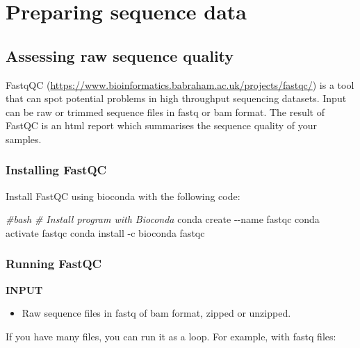 \documentclass[
  12pt,
]{article}
\newenvironment{Shaded}{\begin{snugshade}}{\end{snugshade}}
\newcommand{\AttributeTok}[1]{\textcolor[rgb]{0.13,0.29,0.53}{#1}}
\newcommand{\CommentTok}[1]{\textcolor[rgb]{0.56,0.35,0.01}{\textit{#1}}}
\newcommand{\ExtensionTok}[1]{#1}
\newcommand{\NormalTok}[1]{#1}
\providecommand{\tightlist}{%
  \setlength{\itemsep}{0pt}\setlength{\parskip}{0pt}}
\begin{document}
\hypertarget{preparing-sequence-data}{%
\section{Preparing sequence data}\label{preparing-sequence-data}}

\hypertarget{assessing-raw-sequence-quality}{%
\subsection{Assessing raw sequence quality}\label{assessing-raw-sequence-quality}}

FastqQC (\url{https://www.bioinformatics.babraham.ac.uk/projects/fastqc/}) is a tool that can spot potential problems in high throughput sequencing datasets. Input can be raw or trimmed sequence files in fastq or bam format. The result of FastQC is an html report which summarises the sequence quality of your samples.

\hypertarget{installing-fastqc}{%
\subsubsection{Installing FastQC}\label{installing-fastqc}}

Install FastQC using bioconda with the following code:

\begin{Shaded}
\begin{Highlighting}[]
\CommentTok{\#bash}
\CommentTok{\# Install program with Bioconda}
\ExtensionTok{conda}\NormalTok{ create }\AttributeTok{{-}{-}name}\NormalTok{ fastqc}
\ExtensionTok{conda}\NormalTok{ activate fastqc}
\ExtensionTok{conda}\NormalTok{ install }\AttributeTok{{-}c}\NormalTok{ bioconda fastqc}
\end{Highlighting}
\end{Shaded}

\hypertarget{running-fastqc}{%
\subsubsection{Running FastQC}\label{running-fastqc}}

\textbf{INPUT}

\begin{itemize}
\tightlist
\item
  Raw sequence files in fastq of bam format, zipped or unzipped.
\end{itemize}

If you have many files, you can run it as a loop. For example, with fastq files:
\end{document}
